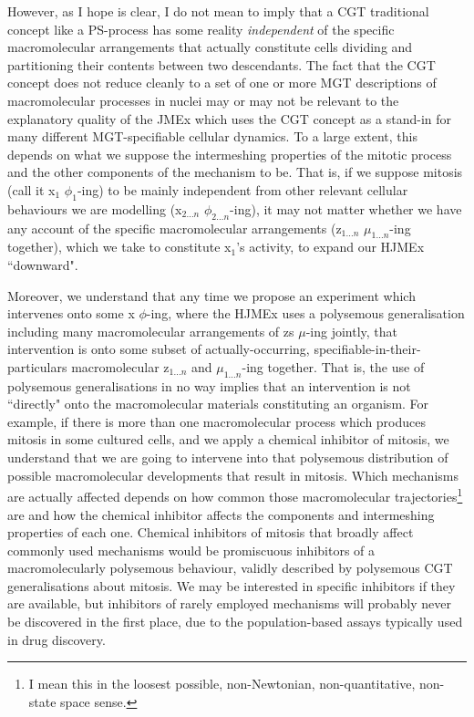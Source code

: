  However, as I hope is clear, I do not mean to imply that a CGT traditional concept like a PS-process has some reality \textit{independent} of the specific macromolecular arrangements that actually constitute cells dividing and partitioning their contents between two descendants. The fact that the CGT concept does not reduce cleanly to a set of one or more MGT descriptions of macromolecular processes in nuclei may or may not be relevant to the explanatory quality of the JMEx which uses the CGT concept as a stand-in for many different MGT-specifiable cellular dynamics. To a large extent, this depends on what we suppose the intermeshing properties of the mitotic process and the other components of the mechanism to be. That is, if we suppose mitosis (call it x$_1$ $\phi_1$-ing) to be mainly independent from other relevant cellular behaviours we are modelling (x$_{2\ldots n}$ $\phi_{2\ldots n}$-ing), it may not matter whether we have any account of the specific macromolecular arrangements (z$_{1\ldots n}$ $\mu_{1\ldots n}$-ing together), which we take to constitute x$_1$'s activity, to expand our HJMEx ``downward".
 
 Moreover, we understand that any time we propose an experiment which intervenes onto some x $\phi$-ing, where the HJMEx uses a polysemous generalisation including many macromolecular arrangements of zs $\mu$-ing jointly, that intervention is onto some subset of actually-occurring, specifiable-in-their-particulars macromolecular z$_{1 \ldots n}$ and  $\mu_{1 \ldots n}$-ing together. That is, the use of polysemous generalisations in no way implies that an intervention is not ``directly" onto the macromolecular materials constituting an organism. For example, if there is more than one macromolecular process which produces mitosis in some cultured cells, and we apply a chemical inhibitor of mitosis, we understand that we are going to intervene into that polysemous distribution of possible macromolecular developments that result in mitosis. Which mechanisms are actually affected depends on how common those macromolecular trajectories\footnote{I mean this in the loosest possible, non-Newtonian, non-quantitative, non-state space sense.} are and how the chemical inhibitor affects the components and intermeshing properties of each one. Chemical inhibitors of mitosis that broadly affect commonly used mechanisms would be promiscuous inhibitors of a macromolecularly polysemous behaviour, validly described by polysemous CGT generalisations about mitosis. We may be interested in specific inhibitors if they are available, but inhibitors of rarely employed mechanisms will probably never be discovered in the first place, due to the population-based assays typically used in drug discovery.
 
